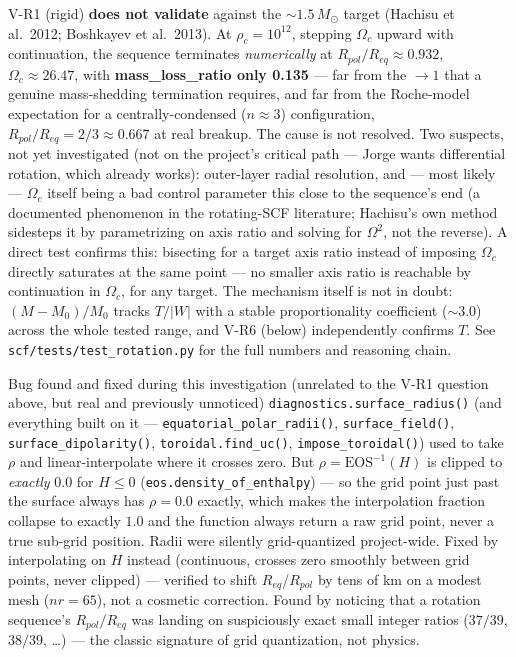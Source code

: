 \documentclass[11pt,a4paper]{scrartcl}
\newcommand{\code}[1]{\texttt{\small #1}}
\begin{document}
V-R1 (rigid) \textbf{does not validate} against the $\sim1.5\,M_\odot$
target (Hachisu et al.\ 2012; Boshkayev et al.\ 2013). At
$\rho_c=10^{12}$, stepping $\Omega_c$ upward with continuation, the
sequence terminates \emph{numerically} at $R_{pol}/R_{eq}\approx0.932$,
$\Omega_c\approx26.47$, with \textbf{mass\_loss\_ratio only 0.135} ---
far from the $\to1$ that a genuine mass-shedding termination requires,
and far from the Roche-model expectation for a centrally-condensed
($n\approx3$) configuration, $R_{pol}/R_{eq}=2/3\approx0.667$ at real
breakup. The cause is not resolved. Two suspects, not yet investigated
(not on the project's critical path --- Jorge wants differential
rotation, which already works): outer-layer radial resolution, and ---
most likely --- $\Omega_c$ itself being a bad control parameter this
close to the sequence's end (a documented phenomenon in the
rotating-SCF literature; Hachisu's own method sidesteps it by
parametrizing on axis ratio and solving for $\Omega^2$, not the
reverse). A direct test confirms this: bisecting for a target axis ratio
instead of imposing $\Omega_c$ directly saturates at the same point ---
no smaller axis ratio is reachable by continuation in $\Omega_c$, for
any target. The mechanism itself is not in doubt: $(M-M_0)/M_0$ tracks
$T/|W|$ with a stable proportionality coefficient ($\sim3.0$) across the
whole tested range, and V-R6 (below) independently confirms $T$. See
\code{scf/tests/test\_rotation.py} for the full numbers and reasoning
chain.

\begin{whybox}{Bug found and fixed during this investigation (unrelated to the V-R1 question above, but real and previously unnoticed)}
\code{diagnostics.surface\_radius()} (and everything built on it ---
\code{equatorial\_polar\_radii()}, \code{surface\_field()},
\code{surface\_dipolarity()}, \code{toroidal.find\_uc()},
\code{impose\_toroidal()}) used to take $\rho$ and linear-interpolate
where it crosses zero. But $\rho=\mathrm{EOS}^{-1}(H)$ is clipped to
\emph{exactly} $0.0$ for $H\le0$ (\code{eos.density\_of\_enthalpy}) ---
so the grid point just past the surface always has $\rho=0.0$ exactly,
which makes the interpolation fraction collapse to exactly $1.0$ and the
function always return a raw grid point, never a true sub-grid position.
Radii were silently grid-quantized project-wide. Fixed by interpolating
on $H$ instead (continuous, crosses zero smoothly between grid points,
never clipped) --- verified to shift $R_{eq}$/$R_{pol}$ by tens of km on
a modest mesh ($nr=65$), not a cosmetic correction. Found by noticing
that a rotation sequence's $R_{pol}/R_{eq}$ was landing on suspiciously
exact small integer ratios ($37/39$, $38/39$, \ldots) --- the classic
signature of grid quantization, not physics.
\end{whybox}
\end{document}
